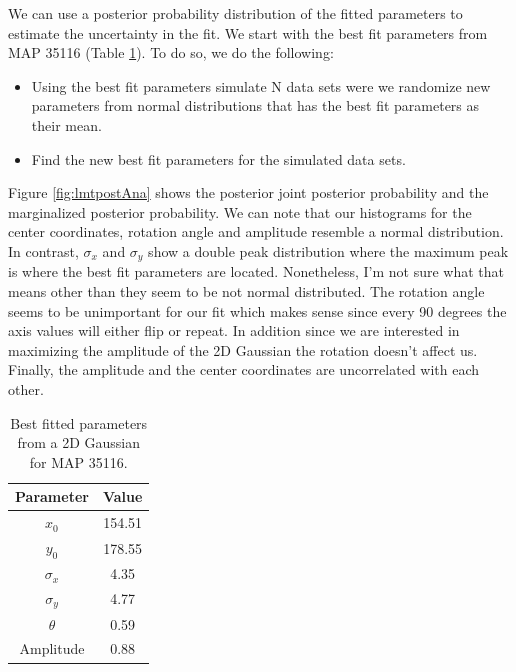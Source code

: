 We can use a posterior probability distribution of the fitted parameters to estimate the uncertainty in the fit. We start with the best fit parameters from MAP 35116 (Table \ref{tab:lmtMap2}). To do so, we do the following:
\begin{itemize}
    \item Using the best fit parameters simulate N data sets were we randomize new parameters from normal distributions that has the best fit parameters as their mean.
    \item Find the new best fit parameters for the simulated data sets.
\end{itemize}

Figure \ref{fig:lmtpostAna} shows the posterior joint posterior probability and the marginalized posterior probability. 
We can note that our histograms for the center coordinates, rotation angle and amplitude resemble a normal distribution. 
In contrast, $\sigma_x$ and $\sigma_y$ show a double peak distribution where the maximum peak is where the best fit parameters are located. 
Nonetheless, I'm not sure what that means other than they seem to be not normal distributed.  
The rotation angle seems to be unimportant for our fit which makes sense since every 90 degrees the axis values will either flip or repeat. In addition since we are interested in maximizing the amplitude of the 2D Gaussian the rotation doesn't affect us.
Finally, the amplitude and the center coordinates are uncorrelated with each other. 

\begin{table}[ht]
    \centering
    \begin{tabular}{|c|c|}
        \toprule
         Parameter & Value  \\
         \midrule
         $x_0$       & 154.51 \\
         $y_0$       & 178.55 \\
         $\sigma_x$  & 4.35   \\
         $\sigma_y$  & 4.77   \\
         $\theta$    & 0.59   \\
         Amplitude   & 0.88   \\
         \bottomrule
    \end{tabular}
    \caption{Best fitted parameters from a 2D Gaussian for MAP 35116.}
    \label{tab:lmtMap2}
\end{table}


